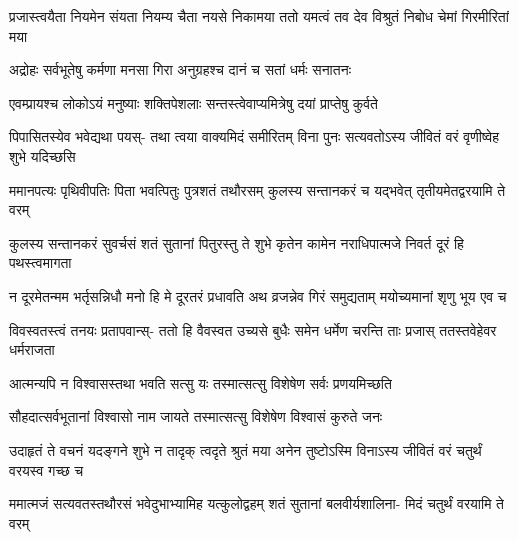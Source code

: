 


\fourlineindentedshloka
{प्रजास्त्वयैता नियमेन संयता}
{नियम्य चैता नयसे निकामया}
{ततो यमत्वं तव देव विश्रुतं}
{निबोध चेमां गिरमीरितां मया}


\twolineshloka
{अद्रोहः सर्वभूतेषु कर्मणा मनसा गिरा}
{अनुग्रहश्च दानं च सतां धर्मः सनातनः}


\twolineshloka
{एवम्प्रायश्च लोकोऽयं मनुष्याः शक्तिपेशलाः}
{सन्तस्त्वेवाप्यमित्रेषु दयां प्राप्तेषु कुर्वते}




\fourlineindentedshloka
{पिपासितस्येव भवेद्यथा पयस्-}
{तथा त्वया वाक्यमिदं समीरितम्}
{विना पुनः सत्यवतोऽस्य जीवितं}
{वरं वृणीष्वेह शुभे यदिच्छसि}




\fourlineindentedshloka
{ममानपत्यः पृथिवीपतिः पिता}
{भवत्पितुः पुत्रशतं तथौरसम्}
{कुलस्य सन्तानकरं च यद्भवेत्}
{तृतीयमेतद्वरयामि ते वरम्}




\fourlineindentedshloka
{कुलस्य सन्तानकरं सुवर्चसं}
{शतं सुतानां पितुरस्तु ते शुभे}
{कृतेन कामेन नराधिपात्मजे}
{निवर्त दूरं हि पथस्त्वमागता}




\fourlineindentedshloka
{न दूरमेतन्मम भर्तृसन्निधौ}
{मनो हि मे दूरतरं प्रधावति}
{अथ व्रजन्नेव गिरं समुद्यताम्}
{मयोच्यमानां शृणु भूय एव च}


\fourlineindentedshloka
{विवस्वतस्त्वं तनयः प्रतापवान्स्-}
{ततो हि वैवस्वत उच्यसे बुधैः}
{समेन धर्मेण चरन्ति ताः प्रजास्}
{ततस्तवेहेवर धर्मराजता}


\twolineshloka
{आत्मन्यपि न विश्वासस्तथा भवति सत्सु यः}
{तस्मात्सत्सु विशेषेण सर्वः प्रणयमिच्छति}


\twolineshloka
{सौहदात्सर्वभूतानां विश्वासो नाम जायते}
{तस्मात्सत्सु विशेषेण विश्वासं कुरुते जनः}



\fourlineindentedshloka
{उदाहृतं ते वचनं यदङ्गने}
{शुभे न तादृक् त्वदृते श्रुतं मया}
{अनेन तुष्टोऽस्मि विनाऽस्य जीवितं}
{वरं चतुर्थं वरयस्व गच्छ च}




\fourlineindentedshloka
{ममात्मजं सत्यवतस्तथौरसं}
{भवेदुभाभ्यामिह यत्कुलोद्वहम्}
{शतं सुतानां बलवीर्यशालिना-}
{मिदं चतुर्थं वरयामि ते वरम्}

